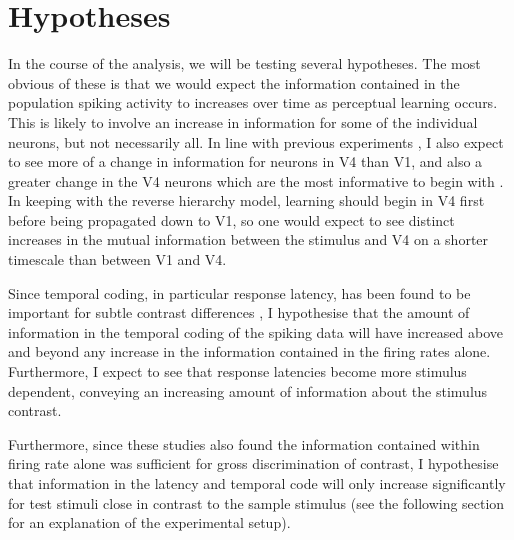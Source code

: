 
\section{Hypotheses}

In the course of the analysis, we will be testing several hypotheses.
The most obvious of these is that we would expect the information contained in the population spiking activity to increases over time as perceptual learning occurs.
This is likely to involve an increase in information for some of the individual neurons, but not necessarily all.
In line with previous experiments \cite{Raiguel2006}, I also expect to see more of a change in information for neurons in \ac{V4} than \ac{V1}, and also a greater change in the \ac{V4} neurons which are the most informative to begin with \cite{Raiguel2006}.
In keeping with the reverse hierarchy model, learning should begin in \ac{V4} first before being propagated down to \ac{V1}, so one would expect to see distinct increases in the mutual information between the stimulus and \ac{V4} on a shorter timescale than between \ac{V1} and \ac{V4}.

Since temporal coding, in particular response latency, has been found to be important for subtle contrast differences \cite{Reich2001,Arabzadeh2006}, I hypothesise that the amount of information in the temporal coding of the spiking data will have increased above and beyond any increase in the information contained in the firing rates alone.
Furthermore, I expect to see that response latencies become more stimulus dependent, conveying an increasing amount of information about the stimulus contrast.

Furthermore, since these studies \cite{Reich2001,Arabzadeh2006} also found the information contained within firing rate alone was sufficient for gross discrimination of contrast, I hypothesise that information in the latency and temporal code will only increase significantly for test stimuli close in contrast to the sample stimulus (see the following section for an explanation of the experimental setup).
